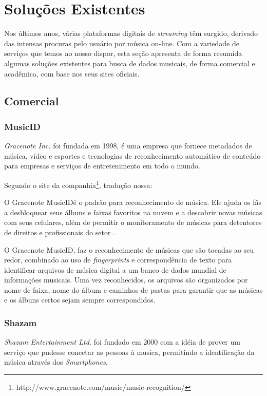 \chapter{Soluções Existentes} \label{cap:solucoes}
Nos últimos anos, várias plataformas digitais de \textit{streaming} têm surgido, derivado das intensas procuras pelo usuário por música on-line. Com a variedade de serviços que temos ao nosso dispor, esta seção apresenta de forma resumida algumas soluções existentes para busca de dados musicais, de forma comercial e acadêmica, com base nos seus sites oficiais.

\section{Comercial}

\subsection{MusicID}
\textit{Gracenote Inc.} foi fundada em 1998, é uma empresa que fornece metadados de música, vídeo e esportes e tecnologias de reconhecimento automático de conteúdo para empresas e serviços de entretenimento em todo o mundo.

Segundo o site da companhia\footnote{http://www.gracenote.com/music/music-recognition/}, tradução nossa:

\begin{citacao}
O Gracenote MusicID\textregistered é o padrão para reconhecimento de música. Ele ajuda os fãs a desbloquear seus álbuns e faixas favoritos na nuvem e a descobrir novas músicas com seus celulares, além de permitir o monitoramento de músicas para detentores de direitos e profissionais do setor \cite{musicid1998}.
\end{citacao}

O Gracenote MusicID\textregistered, faz o reconhecimento de músicas que são tocadas ao seu redor, combinado ao uso de \textit{fingerprints} e correspondência de texto para identificar arquivos de música digital a um banco de dados mundial de informações musicais. Uma vez reconhecidos, os arquivos são organizados por nome de faixa, nome do álbum e caminhos de pastas para garantir que as músicas e os álbuns certos sejam sempre correspondidos.

\subsection{Shazam}
\textit{Shazam Entertainment Ltd.} foi fundado em 2000 com a idéia de prover um serviço que pudesse conectar as pessoas à musica, permitindo a identificação da música através dos \textit{Smartphones}.

